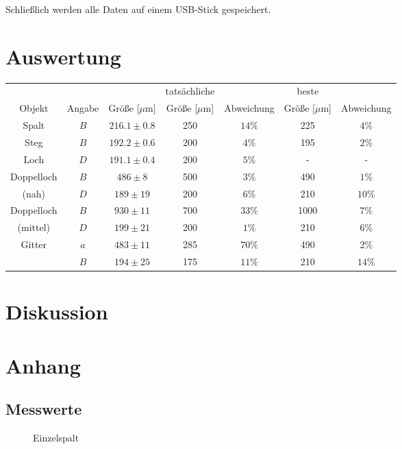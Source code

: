 \documentclass[12pt,a4paper,titlepage,headinclude,bibtotoc]{scrartcl}
\begin{document}
Schließlich werden alle Daten auf einem USB-Stick gespeichert.

\section{Auswertung}
\label{sec:auswertung}

\begin{table}[!htb]
	\centering
	\begin{tabular}{|c|c||c||c|c||c|c|}
		\hline
		 & & & tatsächliche &  & beste &  \\
		Objekt & Angabe & Größe [$\mu$m] & Größe [$\mu$m] & Abweichung & Größe [$\mu$m] & Abweichung \\
		\hline
		\hline
		Spalt & $B$ & $216.1 \pm 0.8$ & 250 & $14\%$ & 225 & $4\%$ \\
		Steg & $B$ & $192.2 \pm 0.6$ & 200 & $4\%$ & 195 & $2\%$ \\
		Loch & $D$ & $191.1 \pm 0.4$ & 200 & $5\%$ & - & - \\
		\hline
		Doppelloch & $B$ & $486 \pm 8$ & 500 & $3\%$ & 490 & $1\%$ \\
		(nah) & $D$ & $189 \pm 19$ & 200 & $6\%$ & 210 & $10\%$ \\
		\hline
		Doppelloch & $B$& $930 \pm 11$ & 700 & $33\%$ & 1000 & $7\%$ \\
		(mittel) & $D$& $199 \pm 21$ & 200 & $1\%$ & 210 & $6\%$ \\
		\hline		
		Gitter & $a$ & $483  \pm 11$ & 285 & $70\%$ & 490 & $2\%$ \\
		& $B$ & $194 \pm 25$ & 175 & $11\%$ & 210 & $14\%$ \\
		\hline
	\end{tabular}
\end{table}


\section{Diskussion}
\label{sec:diskussion}

\section{Anhang}
\subsection{Messwerte}
\begin{figure}[!htb]
	\centering
	
	\caption{Einzelspalt}
\end{figure}
\end{document}

